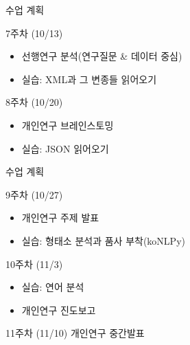\documentclass[11pt, aspectratio=169]{beamer}
\begin{document}
\begin{frame}[t]{수업 계획}
  \begin{block}{7주차 (10/13)}
    \begin{itemize}
      \item 선행연구 분석(연구질문 \& 데이터 중심)
      \item 실습: XML과 그 변종들 읽어오기
    \end{itemize}    
  \end{block}

  \begin{block}{8주차 (10/20)}
    \begin{itemize}
      \item 개인연구 브레인스토밍
      \item 실습: JSON 읽어오기
    \end{itemize}    
  \end{block}

\end{frame}

\begin{frame}[t]{수업 계획}

  \begin{block}{9주차 (10/27)}
    \begin{itemize}
      \item 개인연구 주제 발표
      \item 실습: 형태소 분석과 품사 부착(koNLPy)
    \end{itemize}    
  \end{block}

  \begin{block}{10주차 (11/3)}
    \begin{itemize}
      \item 실습: 연어 분석
      \item 개인연구 진도보고
    \end{itemize}    
  \end{block}

  \begin{block}{11주차 (11/10)}
    개인연구 중간발표
  \end{block}

\end{frame}
\end{document}
